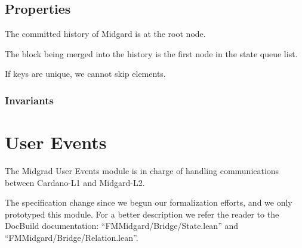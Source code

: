 \subsection{Properties}

\begin{theorem}
  \label{thm:StateQueue.Props.only_one_confirmed_state}
  \leanok
  The committed history of Midgard is at the root node.
  \end{theorem}

\begin{theorem}
  \label{thm:StateQueue.Props.block_merging_order}
  \leanok
  The block being merged into the history is the first node in the state queue
list.
  \end{theorem}

If keys are unique, we cannot skip elements.

\subsubsection{Invariants}



\section{User Events}

The Midgrad User Events module is in charge of handling communications between
Cardano-L1 and Midgard-L2.

The specification change since we begun our formalization efforts, and we only
prototyped this module.
%
For a better description we refer the reader to the DocBuild documentation:
``FMMidgard/Bridge/State.lean'' and
``FMMidgard/Bridge/Relation.lean''.

